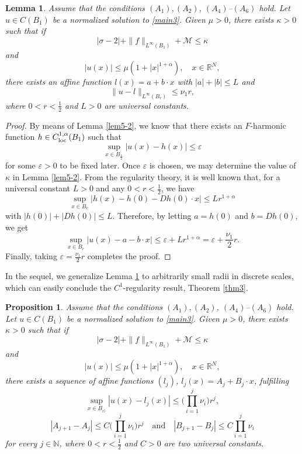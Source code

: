 \documentclass[11pt,reqno]{amsart}
\numberwithin{equation}{section}
\newtheorem{lemma}[theorem]{Lemma}
\newtheorem{proposition}[theorem]{Proposition}
\begin{document}
\begin{lemma}
\label{lem5-3}
Assume that the conditions $(A_1), (A_2)$, $(A_4)$--$(A_6)$ hold. Let $u\in C(B_1)$ be a normalized solution to \eqref{main3}. Given $\mu>0$, there exists $\kappa>0$ such that if%
$$
|\sigma-2|+\|f\|_{L^\infty(B_1)}+\mathcal{M}\leq \kappa
$$
and
$$
|u(x)|\le\mu(1+|x|^{1+\alpha}), \quad  x\in\mathbb{R}^N,
$$
there exists an affine function $l(x)=a+b\cdot x $ with $|a|+|b|\le L$ and %
$$
\|u-l\|_{L^\infty(B_r)}\leq \nu_1r,
$$
where $0<r<\frac12$ and $L>0$ are universal constants.
\end{lemma}

\begin{proof}
By means of Lemma \ref{lem5-2}, we know that there exists an $F$-harmonic function $h\in C^{1,\alpha}_{\rm loc}(B_1)$ such that
$$
\sup_{x\in B_{\frac12}}|u(x)-h(x)|\le \varepsilon
$$
for some $\varepsilon>0$ to be fixed later. Once $\varepsilon$ is chosen, we may determine the value of $\kappa$ in Lemma \ref{lem5-2}. From the regularity theory, it is well known that, for a universal constant $L>0$ and any $0<r<\frac12$, we have
$$
\sup_{x\in B_r}|h(x)-h(0)-Dh(0)\cdot x|\le Lr^{1+\alpha}
$$
with $|h(0)|+|Dh(0)|\le L$. Therefore, by letting $a=h(0)$ and $b=Dh(0)$, we get
$$
\sup_{x\in B_r}|u(x)-a-b\cdot x|\le \varepsilon+Lr^{1+\alpha}=\varepsilon+\frac{\nu_1}{2}r.
$$
Finally, taking $\varepsilon=\frac{\nu_1}{2}r$ completes the proof.
\end{proof}

In the sequel, we generalize Lemma \ref{lem5-3} to arbitrarily small radii in discrete scales, which can easily conclude the $C^1$-regularity result, Theorem \ref{thm3}.

\begin{proposition}
\label{pro5-4}
Assume that the conditions $(A_1), (A_2)$, $(A_4)$--$(A_6)$ hold. Let $u\in C(B_1)$ be a normalized solution to \eqref{main3}. Given $\mu>0$, there exists $\kappa>0$ such that if%
$$
|\sigma-2|+\|f\|_{L^\infty(B_1)}+\mathcal{M}\leq \kappa
$$
and
$$
|u(x)|\le\mu(1+|x|^{1+\alpha}),\quad  x\in\mathbb{R}^N,
$$
there exists a sequence of affine functions $(l_j)$, %
$l_j(x)=A_j+B_j \cdot x$, fulfilling
$$
\sup_{x\in B_{r^j}}|u(x)-l_j(x)|\leq \biggl(\prod^j_{i=1}\nu_i\biggr)r^j,
$$
$$
|A_{j+1}-A_j|\le C\biggl(\prod^j_{i=1}\nu_i\biggr)r^j
\quad\text{and}\quad
|B_{j+1}-B_j|\le C\prod^j_{i=1}\nu_i
$$
for every $j\in\mathbb{N}$, where $0<r<\frac12$ and $C>0$ are two universal constants.
\end{proposition}
\end{document}
